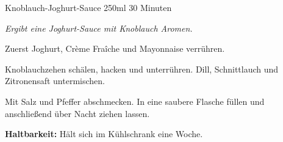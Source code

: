 \documentclass[
  DIV=11,%
  pagesize,%
  fontsize=11pt,%
  paper=a4,%
]{scrartcl}
\begin{document}
\begin{recipe}{Knoblauch-Joghurt-Sauce} {250ml} {30 Minuten}

\freeform
\textit{Ergibt eine Joghurt-Sauce mit Knoblauch Aromen.}


Zuerst Joghurt, Crème Fraîche und Mayonnaise verrühren.


Knoblauchzehen schälen, hacken und unterrühren.
Dill, Schnittlauch und Zitronensaft untermischen.


Mit Salz und Pfeffer abschmecken.
In eine saubere Flasche füllen und anschließend über Nacht ziehen lassen.

\freeform
\hrulefill

\freeform 
\textbf{Haltbarkeit:}
Hält sich im Kühlschrank eine Woche.

\end{recipe}
\end{document}
